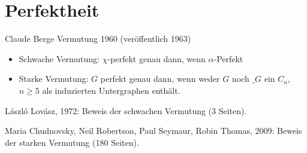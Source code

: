 \section{Perfektheit}


Claude Berge Vermutung 1960 (veröffentlich 1963)
\begin{itemize}
    \item
        Schwache Vermutung: $\chi$-perfekt genau dann, wenn $\alpha$-Perfekt
    \item
        Starke Vermutung: $G$ perfekt genau dann, wenn weder $G$ noch $\_G$ ein $C_n$, $n \ge 5$ als induzierten Untergraphen enthält.
\end{itemize}

László Lovász, 1972: Beweis der schwachen Vermutung (3 Seiten).

Maria Chudnovsky, Neil Robertson, Paul Seymaur, Robin Thomas, 2009: Beweis der starken Vermutung (180 Seiten).


